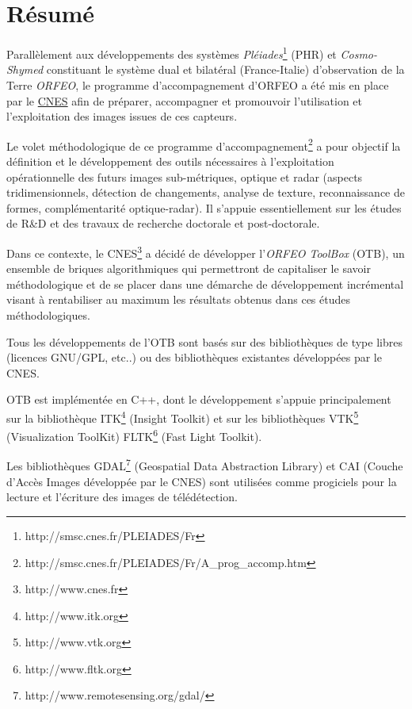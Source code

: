 \chapter*{R\'{e}sum\'{e}}
\noindent

Parall\`{e}lement aux d\'{e}veloppements des syst\`{e}mes \emph{Pl\'{e}iades}\footnote{http://smsc.cnes.fr/PLEIADES/Fr} (PHR) et \emph{Cosmo-Shymed} constituant le syst\`{e}me 
dual et bilat\'{e}ral (France-Italie) d'observation de la Terre \emph{ORFEO}, le 
programme d'accompagnement d'ORFEO a \'{e}t\'{e} mis en place par le \href{http://www.cnes.fr}{CNES} 
afin de pr\'{e}parer, accompagner et promouvoir l'utilisation  et l'exploitation des images issues de ces capteurs. 

Le volet m\'{e}thodologique de ce programme d'accompagnement\footnote{http://smsc.cnes.fr/PLEIADES/Fr/A\_prog\_accomp.htm} a pour objectif la d\'{e}finition et le d\'{e}veloppement des outils n\'{e}cessaires \`{a} l'exploitation 
op\'{e}rationnelle des futurs images sub-m\'{e}triques, optique et radar (aspects tridimensionnels, d\'{e}tection de changements, analyse de texture, 
reconnaissance de formes, compl\'{e}mentarit\'{e} optique-radar). Il s'appuie essentiellement sur les \'{e}tudes de R\&D et des 
travaux de recherche doctorale et post-doctorale.

Dans ce contexte, le CNES\footnote{http://www.cnes.fr} a d\'{e}cid\'{e} de d\'{e}velopper l'\emph{ORFEO ToolBox} (OTB), un ensemble de briques algorithmiques qui 
permettront de capitaliser le savoir m\'{e}thodologique et de se placer dans une d\'{e}marche de d\'{e}veloppement incr\'{e}mental visant 
\`{a} rentabiliser au maximum les r\'{e}sultats obtenus dans ces \'{e}tudes m\'{e}thodologiques.


Tous les d\'{e}veloppements de l'OTB sont bas\'{e}s sur des biblioth\`{e}ques de type libres (licences GNU/GPL, etc..) 
ou des biblioth\`{e}ques existantes d\'{e}velopp\'{e}es par le CNES.


OTB est impl\'{e}ment\'{e}e en C++, dont le d\'{e}veloppement s'appuie principalement sur la biblioth\`{e}que
 ITK\footnote{http://www.itk.org} (Insight Toolkit) et sur les biblioth\`{e}ques VTK\footnote{http://www.vtk.org} (Visualization ToolKit) 
 FLTK\footnote{http://www.fltk.org} (Fast Light Toolkit).

Les biblioth\`{e}ques GDAL\footnote{http://www.remotesensing.org/gdal/} (Geospatial Data Abstraction Library) et 
CAI (Couche d'Acc\`{e}s Images d\'{e}velopp\'{e}e par le CNES) sont utilis\'{e}es comme progiciels pour la lecture et l'\'{e}criture des images de t\'{e}l\'{e}d\'{e}tection.


